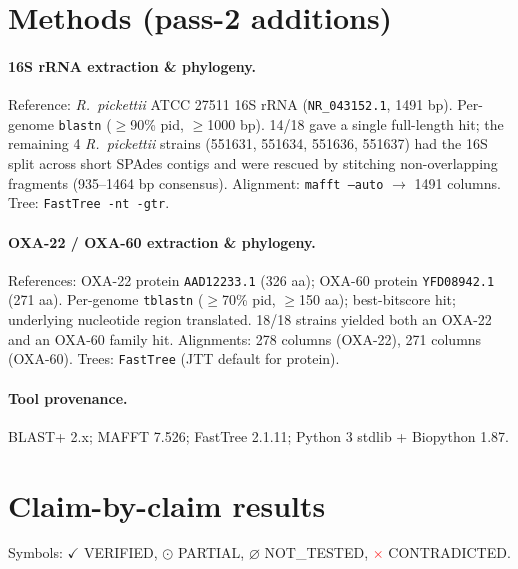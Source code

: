 \documentclass[11pt]{article}
\begin{document}
\section{Methods (pass-2 additions)}

\paragraph{16S rRNA extraction \& phylogeny.} Reference: \emph{R.\ pickettii} ATCC 27511 16S rRNA
(\texttt{NR\_043152.1}, 1491 bp). Per-genome \texttt{blastn} ($\geq$90\% pid, $\geq$1000 bp).
14/18 gave a single full-length hit; the remaining 4 \emph{R.\ pickettii} strains (551631,
551634, 551636, 551637) had the 16S split across short SPAdes contigs and were rescued by
stitching non-overlapping fragments (935--1464 bp consensus). Alignment: \texttt{mafft --auto}
$\rightarrow$ 1491 columns. Tree: \texttt{FastTree -nt -gtr}.

\paragraph{OXA-22 / OXA-60 extraction \& phylogeny.} References: OXA-22 protein \texttt{AAD12233.1}
(326 aa); OXA-60 protein \texttt{YFD08942.1} (271 aa). Per-genome \texttt{tblastn} ($\geq$70\% pid,
$\geq$150 aa); best-bitscore hit; underlying nucleotide region translated. 18/18 strains yielded
both an OXA-22 and an OXA-60 family hit. Alignments: 278 columns (OXA-22), 271 columns (OXA-60).
Trees: \texttt{FastTree} (JTT default for protein).

\paragraph{Tool provenance.} BLAST+ 2.x; MAFFT 7.526; FastTree 2.1.11; Python 3 stdlib + Biopython 1.87.

\section{Claim-by-claim results}

Symbols: $\checkmark$ VERIFIED, $\odot$ PARTIAL, $\varnothing$ NOT\_TESTED,
\textcolor{red}{$\times$} CONTRADICTED.
\end{document}
